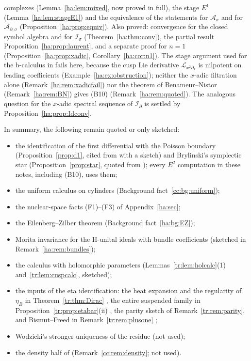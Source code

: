 \documentclass[11pt,oneside,reqno]{article}
\newcommand{\Is}{\mathcal I_\sigma}
\newcommand{\Id}{\mathcal I_\partial}
\newcommand{\As}{\mathcal A_\sigma}
\newcommand{\Ads}{\mathcal A_{\partial,\sigma}}
\theoremstyle{plain}
\theoremstyle{definition}
\theoremstyle{remark}
\begin{document}
\begin{enumerate}
complexes (Lemma~\ref{ha:lem:mixed}, now proved in full), the stage
\(E^1\) (Lemma~\ref{ha:lem:stageE1}) and the equivalence of the
statements for \(\As\) and for \(\Ads\) (Proposition~\ref{ha:prop:equiv}).
Also proved: convergence for the closed symbol algebra and for \(\Is\)
(Theorem~\ref{ha:thm:conv}), the partial result
Proposition~\ref{ha:prop:laurent}, and a separate proof for \(n=1\)
(Proposition~\ref{ha:prop:xadic}, Corollary~\ref{ha:cor:n1}). The stage
argument used for the b-calculus in \cite{HHb} fails here, because the
cusp Lie derivative \(\mathcal L_{x^2\partial_x}\) is nilpotent on leading
coefficients (Example~\ref{ha:ex:obstruction}); neither the \(x\)-adic
filtration alone (Remark~\ref{ha:rem:xadicfail}) nor the theorem of
Benameur--Nistor \cite{BN} (Remark~\ref{ha:rem:BN}) gives (B10)
(Remark~\ref{ha:rem:quoted}). The analogous question for the \(x\)-adic
spectral sequence of \(\Id\) is settled by
Proposition~\ref{ha:prop:Idconv}.
\end{enumerate}
In summary, the following remain quoted or only sketched:
\begin{itemize}
\item the identification of the first differential with the Poisson
boundary (Proposition~\ref{prop:d1}, cited from \cite{MelroseMicro} with a
sketch) and Brylinski's symplectic star (Proposition~\ref{prop:star},
quoted from \cite{Brylinski}); every \(E^2\) computation in these notes,
including (B10), uses them;
\item the uniform calculus on cylinders (Background
fact~\ref{cc:bg:uniform});
\item the nuclear-space facts (F1)--(F3) of Appendix~\ref{ha:sec};
\item the Eilenberg--Zilber theorem (Background fact~\ref{ha:bg:EZ});
\item Morita invariance for the H-unital ideals with bundle coefficients
(sketched in Remark~\ref{ha:rem:bundles});
\item the calculus with holomorphic parameters
(Lemmas~\ref{tr:lem:holcalc}(1) and~\ref{tr:lem:cuspcalc}, sketched);
\item the inputs of the eta identification: the heat expansion and the
regularity of \(\eta_B\) in Theorem~\ref{tr:thm:Dirac} \cite{Notes}, the
entire suspended family in Proposition~\ref{tr:prop:etabar}(ii)
\cite{Seeley}, the parity sketch of Remark~\ref{tr:rem:parity}, and
Bismut--Freed in Remark~\ref{tr:rem:plusone} \cite{BismutFreed};
\item Wodzicki's stronger uniqueness of the residue (not used);
\item the density half of \cite[Prop.~26]{MN} (Remark~\ref{cc:rem:density};
not used).
\end{itemize}
\end{document}
